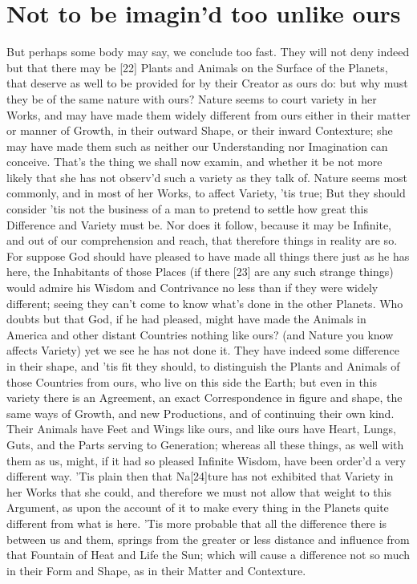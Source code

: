 \documentclass[letterpaper]{book}
\begin{document}
\section{Not to be imagin'd too unlike ours}

But perhaps some body may say, we conclude too fast. They will not deny
indeed but that there may be [22] Plants and Animals on the Surface of the
Planets, that deserve as well to be provided for by their Creator as ours
do: but why must they be of the same nature with ours? Nature seems to court
variety in her Works, and may have made them widely different from ours
either in their matter or manner of Growth, in their outward Shape, or their
inward Contexture; she may have made them such as neither our Understanding
nor Imagination can conceive. That's the thing we shall now examin, and
whether it be not more likely that she has not observ'd such a variety as
they talk of. Nature seems most commonly, and in most of her Works, to
affect Variety, 'tis true; But they should consider 'tis not the business of a
man to pretend to settle how great this Difference and Variety must be. Nor
does it follow, because it may be Infinite, and out of our comprehension and
reach, that therefore things in reality are so. For suppose God should have
pleased to have made all things there just as he has here, the Inhabitants
of those Places (if there [23] are any such strange things) would admire his
Wisdom and Contrivance no less than if they were widely different; seeing
they can't come to know what's done in the other Planets.  Who doubts but
that God, if he had pleased, might have made the Animals in America and
other distant Countries nothing like ours? (and Nature you know affects
Variety) yet we see he has not done it. They have indeed some difference in
their shape, and 'tis fit they should, to distinguish the Plants and Animals
of those Countries from ours, who live on this side the Earth; but even in
this variety there is an Agreement, an exact Correspondence in figure and
shape, the same ways of Growth, and new Productions, and of continuing their
own kind. Their Animals have Feet and Wings like ours, and like ours have
Heart, Lungs, Guts, and the Parts serving to Generation; whereas all these
things, as well with them as us, might, if it had so pleased Infinite
Wisdom, have been order'd a very different way. 'Tis plain then that
Na[24]ture has not exhibited that Variety in her Works that she could, and
therefore we must not allow that weight to this Argument, as upon the
account of it to make every thing in the Planets quite different from what
is here. 'Tis more probable that all the difference there is between us and
them, springs from the greater or less distance and influence from that
Fountain of Heat and Life the Sun; which will cause a difference not so much
in their Form and Shape, as in their Matter and Contexture.
\end{document}
